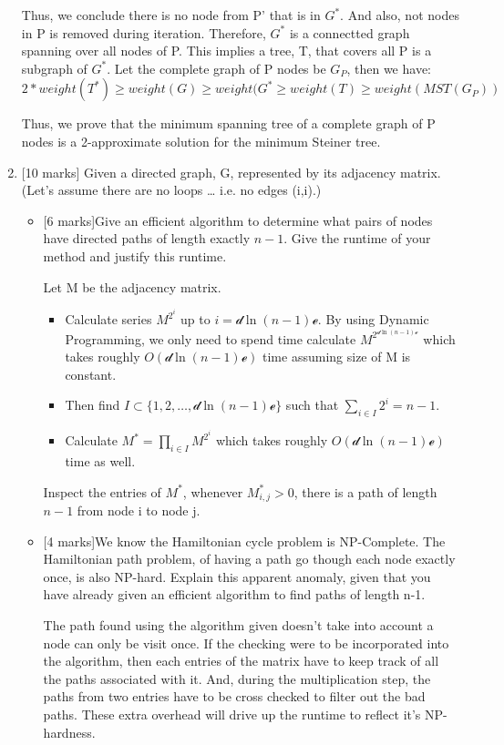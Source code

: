 \documentclass[12pt]{article}
\begin{document}
\begin{enumerate}
Thus, we conclude there is no node from P' that is in $G^{*}$. And also, not nodes in P is removed during iteration. Therefore, $G^{*}$ is a connectted graph spanning over all nodes of P. This implies a tree, T, that covers all P is a subgraph of $G^{*}$. Let the complete graph of P nodes be $G_{P}$, then we have:
\begin{equation}
2 * weight(T^{*}) \geq weight(G) \geq weight(G^{*} \geq weight(T) \geq weight(MST(G_{P}))
\end{equation}

Thus, we prove that the minimum spanning tree of a complete graph of P nodes is a 2-approximate solution for the minimum Steiner tree.

\item{} [10 marks]
Given a directed graph, G, represented by its adjacency matrix. (Let’s assume there are no loops … i.e. no edges (i,i).)
\begin{itemize}
\item{}[6 marks]Give an efficient algorithm to determine what pairs of nodes have directed paths of length exactly $n-1$. Give the runtime of your method and justify this runtime.

Let M be the adjacency matrix.
\begin{itemize}
\item Calculate series $M^{2^{i}}$ up to $i = \mathcal{d} \ln{(n-1)} \mathcal{e}$. By using Dynamic Programming, we only need to spend time calculate $M^{2^{\mathcal{d} \ln{(n-1)} \mathcal{e}}}$ which takes roughly $O(\mathcal{d} \ln{(n-1)} \mathcal{e})$ time assuming size of M is constant.
\item Then find $I \subset \{1, 2, \ldots, \mathcal{d} \ln{(n-1)} \mathcal{e}\}$ such that $\sum_{i \in I}{2^{i}} = n-1$.
\item Calculate $M^{*} = \prod_{i \in I}{M^{2^{i}}}$ which takes roughly $O(\mathcal{d} \ln{(n-1)} \mathcal{e})$ time as well.
\end{itemize}
 Inspect the entries of $M^{*}$, whenever $M^{*}_{i,j} > 0$, there is a path of length $n-1$ from node i to node j.

\item{}[4 marks]We know the Hamiltonian cycle problem is NP-Complete. The Hamiltonian path problem, of having a path go though each node exactly once, is also NP-hard. Explain this apparent anomaly, given that you have already given an efficient algorithm to find paths of length n-1.

The path found using the algorithm given doesn't take into account a node can only be visit once. If the checking were to be incorporated into the algorithm, then each entries of the matrix have to keep track of all the paths associated with it. And, during the multiplication step, the paths from two entries have to be cross checked to filter out the bad paths. These extra overhead will drive up the runtime to reflect it's NP-hardness.
\end{itemize}


\end{enumerate}
\end{document}
